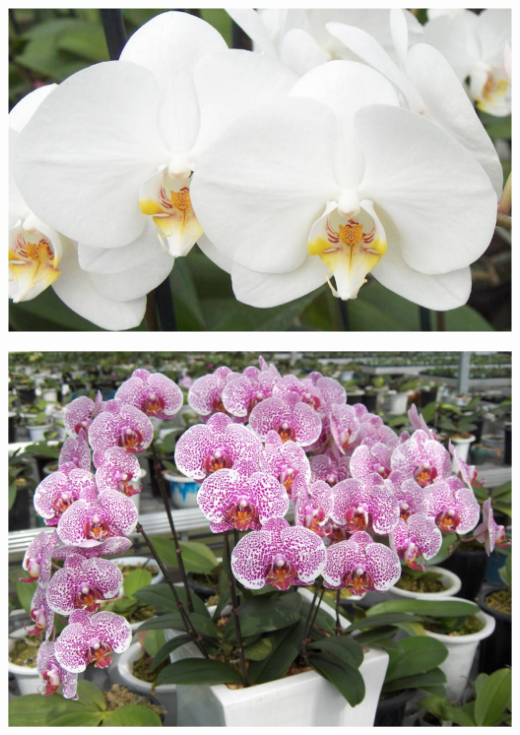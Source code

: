 \documentclass{article}
\begin{document}
\begin{center}
\includegraphics[height=0.9\textheight, angle=90]{../Orchid_Phalaenopsis_(MothOrchid)2.jpg}
\end{center}
\newpage

\begin{center}
\includegraphics[height=0.9\textheight, angle=90]{../Orchid_Phalaenopsis_(MothOrchid)_Plant.jpg}
\end{center}
\newpage
\end{document}
